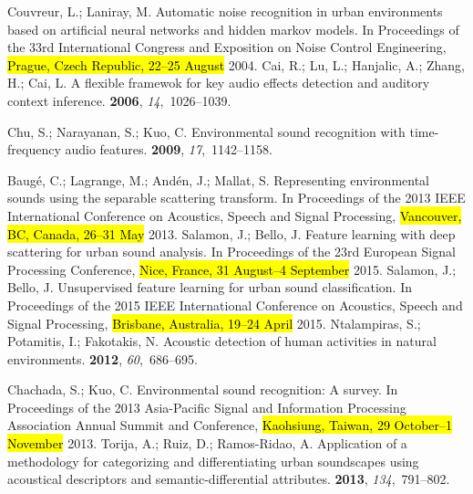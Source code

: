 \documentclass[sensors,article,accept,moreauthors,pdftex,10pt,a4paper]{mdpi}
\begin{document}
\begin{thebibliography}{999}
Couvreur, L.; Laniray, M.
\newblock Automatic noise recognition in urban environments based on artificial
  neural networks and hidden markov models.
\newblock  In Proceedings of the  33rd International Congress and Exposition on Noise Control
  Engineering, \hl{Prague, Czech Republic,  22--25 August }2004.
Cai, R.; Lu, L.; Hanjalic, A.; Zhang, H.; Cai, L.
\newblock A flexible framewok for key audio effects detection and auditory
  context inference.
  {\bf 2006}, {\em 14},~1026--1039.

Chu, S.; Narayanan, S.; Kuo, C.
\newblock Environmental sound recognition with time-frequency audio features.
  {\bf 2009}, {\em 17},~1142--1158.

Baugé, C.; Lagrange, M.; Andén, J.; Mallat, S.
\newblock Representing environmental sounds using the separable scattering
  transform.
\newblock  In Proceedings of the 2013 IEEE International Conference on Acoustics, Speech and Signal
  Processing, \hl{Vancouver, BC, Canada,  26--31 May } 2013.
Salamon, J.; Bello, J.
\newblock Feature learning with deep scattering for urban sound analysis.
\newblock  In  Proceedings of the 23rd European Signal Processing Conference,  \hl{Nice, France, 31 August--4 September }2015.
Salamon, J.; Bello, J.
\newblock Unsupervised feature learning for urban sound classification.
\newblock In Proceedings of the 2015 IEEE International Conference on Acoustics, Speech and Signal
  Processing, \hl{Brisbane,  Australia, 19--24 April } 2015.
Ntalampiras, S.; Potamitis, I.; Fakotakis, N.
\newblock Acoustic detection of human activities in natural environments.
 {\bf 2012}, {\em 60},~686--695.

Chachada, S.; Kuo, C.
\newblock Environmental sound recognition: A survey.
\newblock  In Proceedings of the 2013 Asia-Pacific Signal and Information Processing Association
  Annual Summit and Conference, \hl{Kaohsiung, Taiwan, 29 October--1 November} 2013.
Torija, A.; Ruiz, D.; Ramos-Ridao, A.
\newblock Application of a methodology for categorizing and differentiating
  urban soundscapes using acoustical descriptors and semantic-differential
  attributes.
 {\bf 2013}, {\em 134},~791--802.


\end{thebibliography}
\end{document}
